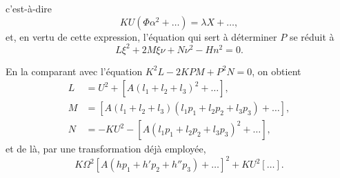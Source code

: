 \documentclass[11pt,a4paper]{book}
\begin{document}
c'est-\`{a}-dire
\[
KU(\Phi \alpha^2 + \ldots) = \lambda X + \ldots,
\]
et, en vertu de cette expression, l'\'{e}quation qui sert \`{a} d\'{e}terminer $P$ se r\'{e}duit \`{a}
\begin{equation}\tag{20}
L\xi^2 + 2M\xi \nu + N\nu^2 - Hn^2 = 0.
\end{equation}

En la comparant avec l'\'{e}quation $K^2L - 2KPM + P^2N = 0$, on obtient
\begin{equation}\tag{21}
\begin{aligned}
L &= U^2 + [A(l_1 + l_2 + l_3)^2 + \ldots], \\
M &= [A(l_1 + l_2 + l_3)(l_1 p_1 + l_2 p_2 + l_3 p_3) + \ldots], \\
N &= -KU^2 - [A(l_1 p_1 + l_2 p_2 + l_3 p_3)^2 + \ldots],
\end{aligned}
\end{equation}
et de l\`{a}, par une transformation d\'{e}j\`{a} employ\'{e}e,
\begin{equation}\tag{22}
K\Omega^2 [A(h p_1 + h' p_2 + h'' p_3) + \ldots]^2 + KU^2 [\ldots].
\end{equation}
\end{document}
